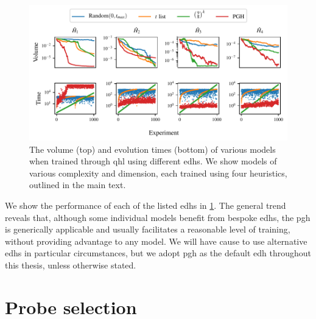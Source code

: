 

\begin{figure}
\begin{center}
    \includegraphics{algorithms/figures/heuristic_comparisons.pdf}
\end{center}
\caption[Effect on model training of the experiment design heuristic]{
    The \gls{volume} (top) and evolution times (bottom) of various models when trained through \gls{qhl} using different \glspl{edh}.
    We show models of various complexity and dimension, each trained using four heuristics, 
    outlined in the main text.
    \figtableref
}
\label{fig:heuristics_test}
\end{figure}

We show the performance of each of the listed \glspl{edh} in \cref{fig:heuristics_test}. 
The general trend reveals that, although some individual models benefit from bespoke \glspl{edh}, 
the \gls{pgh} is generically applicable and usually facilitates a reasonable level of training, 
without providing advantage to any model. 
We will have cause to use alternative \glspl{edh} in particular circumstances, 
but we adopt \gls{pgh} as the default \gls{edh} throughout this thesis, 
unless otherwise stated.

\section{Probe selection}\label{sec:probes}

